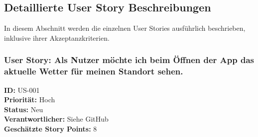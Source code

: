 \documentclass{article}
\begin{document}
%
%
%

\normalsize
\subsection{Detaillierte User Story Beschreibungen}

In diesem Abschnitt werden die einzelnen User Stories ausführlich beschrieben, inklusive ihrer Akzeptanzkriterien.
\newpage
\subsubsection{User Story: Als Nutzer möchte ich beim Öffnen der App das aktuelle Wetter für meinen Standort sehen.}
\textcolor{storyblue}{\textbf{ID:}} US-001 \\
\textcolor{storyblue}{\textbf{Priorität:}} Hoch \\
\textcolor{storyblue}{\textbf{Status:}} Neu \\
\textcolor{storyblue}{\textbf{Verantwortlicher:}} Siehe GitHub \\
\textcolor{storyblue}{\textbf{Geschätzte Story Points:}} 8
\end{document}
